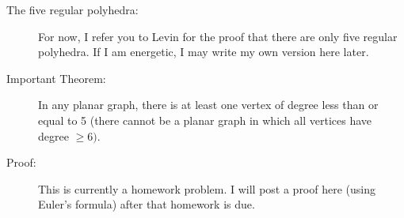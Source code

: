 \documentclass[12pt]{article}
\begin{document}
\begin{description}
\item[The five regular polyhedra:]  For now, I refer you to Levin for the proof that there are only five regular polyhedra.  If I am energetic, I may write my own version here later.

\item[Important Theorem:]  In any planar graph, there is at least one vertex of degree less than or equal to 5 (there cannot be a planar graph in which all vertices have degree $\geq 6)$.

\item[Proof:]  This is currently a homework problem.  I will post a proof here (using Euler's formula) after that homework is due.

\end{description}
\end{document}
